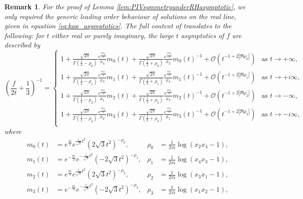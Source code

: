 \documentclass[a4paper,reqno]{amsart}
\numberwithin{equation}{section}
\newtheorem{remark}[theorem]{Remark}
\numberwithin{equation}{section}
\begin{document}
\begin{remark}\label{rem:kapaevgenasymp} For the proof of Lemma \ref{lem:PIVsymmetryunderRHasymptotic}, we only required the generic leading order behaviour of solutions on the real line, given in equation \eqref{eq:kap_asymptotics}. The full content of \cite[Th. 4(ii)]{kapaev1996} translates to the following: for $t$ either real or purely imaginary, the large $t$ asymptotics of $f$ are described by
\begin{equation*}\displaystyle
    \left(\frac{f}{2t}+\frac{1}{3}\right)^{-1}=\begin{cases}\displaystyle
    1+\frac{\sqrt{2\pi}}{\Gamma(\frac{1}{2}-\rho_0)}\frac{e^{\frac{i\pi\rho_0}{2}}}{x_4}m_0(t)+\frac{\sqrt{2\pi}}{\Gamma(\frac{1}{2}+\rho_0)}\frac{e^{\frac{i\pi\rho_0}{2}}}{x_2}m_0(t)^{-1}+\mathcal{O}(t^{-1+2|\Re \rho_0|}) & \text{as $t\rightarrow+\infty$,}\\
   \displaystyle 1+\frac{\sqrt{2\pi}}{\Gamma(\frac{1}{2}-\rho_1)}\frac{e^{\frac{i\pi\rho_1}{2}}}{x_3}m_1(t)+\frac{\sqrt{2\pi}}{\Gamma(\frac{1}{2}+\rho_1)}\frac{e^{\frac{i\pi\rho_1}{2}}}{x_4}m_1(t)^{-1}+\mathcal{O}(t^{-1+2|\Re \rho_1|}) & \text{as $t\rightarrow+i\infty$,}\\
      \displaystyle 1+\frac{\sqrt{2\pi}}{\Gamma(\frac{1}{2}-\rho_2)}\frac{e^{\frac{i\pi\rho_2}{2}}}{x_1}m_2(t)+\frac{\sqrt{2\pi}}{\Gamma(\frac{1}{2}+\rho_2)}\frac{e^{\frac{i\pi\rho_2}{2}}}{x_3}m_2(t)^{-1}+\mathcal{O}(t^{-1+2|\Re \rho_2|}) & \text{as $t\rightarrow-\infty$,}\\
      \displaystyle 1+\frac{\sqrt{2\pi}}{\Gamma(\frac{1}{2}-\rho_{3})}\frac{e^{\frac{i\pi\rho_3}{2}}}{x_2}m_3(t)+\frac{\sqrt{2\pi}}{\Gamma(\frac{1}{2}+\rho_3)}\frac{e^{\frac{i\pi\rho_3}{2}}}{x_1}m_3(t)^{-1}+\mathcal{O}(t^{-1+2|\Re \rho_3|}) & \text{as $t\rightarrow-i\infty$,}\\
    \end{cases}
\end{equation*}
where
\begin{align*}
    m_0(t)&=e^{\frac{\pi i}{3}}e^{\frac{i}{\sqrt{3}}t^2}(2\sqrt{3}t^2)^{-\rho_0}, & \rho_0&=\frac{1}{2\pi i}\log(x_2x_4-1),\\
   m_1(t)&=e^{-\frac{\pi i}{3}}e^{-\frac{i}{\sqrt{3}}t^2}(-2\sqrt{3}t^2)^{-\rho_1}, & \rho_1&=\frac{1}{2\pi i}\log(x_4x_3-1),\\
   m_2(t)&=e^{\frac{\pi i}{3}}e^{\frac{i}{\sqrt{3}}t^2}(2\sqrt{3}t^2)^{-\rho_2}, & \rho_2&=\frac{1}{2\pi i}\log(x_3x_1-1),\\
   m_3(t)&=e^{-\frac{\pi i}{3}}e^{-\frac{i}{\sqrt{3}}t^2}(-2\sqrt{3}t^2)^{-\rho_3}, & \rho_3&=\frac{1}{2\pi i}\log(x_1x_2-1),

\end{align*}
\end{remark}
\end{document}

